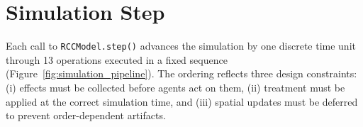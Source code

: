 \section{Simulation Step}
\label{sec:md_step}

Each call to \texttt{RCCModel.step()} advances the simulation by one discrete time unit through 13 operations executed in a fixed sequence (Figure~\ref{fig:simulation_pipeline}).  The ordering reflects three design constraints: (i) effects must be collected before agents act on them, (ii) treatment must be applied at the correct simulation time, and (iii) spatial updates must be deferred to prevent order-dependent artifacts.

